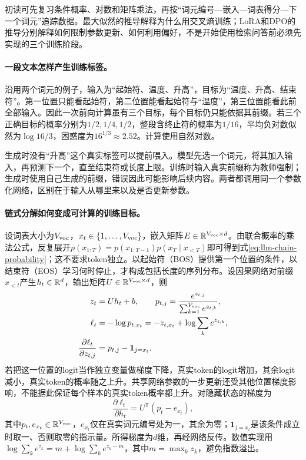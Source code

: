 初读可先复习条件概率、对数和矩阵乘法，再按“词元编号—嵌入—词表得分—下一个词元”追踪数据。最大似然的推导解释为什么用交叉熵训练；LoRA和DPO的推导分别解释如何限制参数更新、如何利用偏好，不是开始使用检索问答前必须先实现的三个训练阶段。

\paragraph{一段文本怎样产生训练标签。}
沿用两个词元的例子，输入为“起始符、温度、升高”，目标为“温度、升高、结束符”。第一位置只能看起始符，第二位置能看起始符与“温度”，第三位置能看此前全部输入。因此一次前向计算虽有三个目标，每个目标仍只能依据其前缀。若三个正确目标的概率分别为$1/2,1/4,1/2$，整段含终止符的概率为$1/16$，平均负对数似然为$\log16/3$，困惑度为$16^{1/3}\approx2.52$。计算使用自然对数。

生成时没有“升高”这个真实标签可以提前喂入。模型先选一个词元，将其加入输入，再预测下一个，直至结束符或长度上限。训练时输入真实前缀称为教师强制；生成时使用自己生成的前缀，错误因此可能影响后续内容。两者都调用同一个参数化网络，区别在于输入从哪里来以及是否更新参数。

\paragraph{链式分解如何变成可计算的训练目标。}
设词表大小为$V_{\rm voc}$，$x_t\in\{1,\ldots,V_{\rm voc}\}$，嵌入矩阵$E\in\mathbb{R}^{V_{\rm voc}\times d}$。由联合概率的乘法公式，反复展开$p(x_{1:T})=p(x_{1:T-1})p(x_T\mid x_{<T})$即可得到式\eqref{eq:llm-chain-probability}；这不要求token独立。以起始符（BOS）提供第一个位置的条件，以结束符（EOS）学习何时停止，才构成包括长度的序列分布。设因果网络对前缀$x_{<t}$产生$h_t\in\mathbb{R}^d$，输出矩阵$U\in\mathbb{R}^{V_{\rm voc}\times d}$，则
\begin{align}
 z_t&=Uh_t+b,\qquad p_{t,j}=\frac{e^{z_{t,j}}}{\sum_{k=1}^{V_{\rm voc}}e^{z_{t,k}}},\\
 \ell_t&=-\log p_{t,x_t}=-z_{t,x_t}+\log\sum_ke^{z_{t,k}},\\
 \frac{\partial\ell_t}{\partial z_{t,j}}&=p_{t,j}-\mathbf1_{j=x_t}.
\end{align}
若把这一位置的logit当作独立变量做梯度下降，真实token的logit增加，其余logit减小，真实token的概率随之上升。共享网络参数的一步更新还受其他位置梯度影响，不能据此保证每个样本的真实token概率都上升。对隐藏状态的梯度为
\begin{equation}
 \frac{\partial\ell_t}{\partial h_t}=U^{\mathsf T}(p_t-e_{x_t}),
\end{equation}
其中$p_t,e_{x_t}\in\mathbb{R}^{V_{\rm voc}}$，$e_{x_t}$仅在真实词元编号处为一，其余为零；$\mathbf1_{j=x_t}$是该条件成立时取一、否则取零的指示量。所得梯度为$d$维，再经网络反传。数值实现用$\log\sum_ke^{z_k}=m+\log\sum_ke^{z_k-m}$，其中$m=\max_k z_k$，避免指数溢出。

